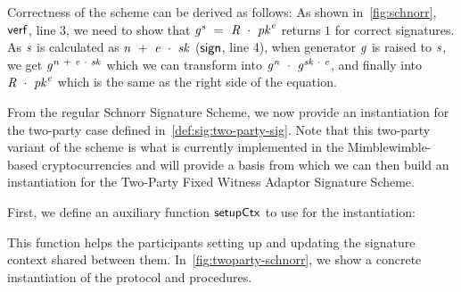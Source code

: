 Correctness of the scheme can be derived as follows:
As shown in~\cref{fig:schnorr}, $\mathsf{verf}$, line 3, we need to show that $\mathit{g}^{\mathit{s}} ~=~ \mathit{R} ~\cdot~ \mathit{pk}^{\mathit{e}}$ returns $1$ for correct signatures.
As $\mathit{s}$ is calculated as $\mathit{n} ~+~ \mathit{e} ~\cdot~ \mathit{sk}$ ($\mathsf{sign}$, line 4), when generator $\mathit{g}$ is raised to $\mathit{s}$, we get $\mathit{g}^{\mathit{n} ~+~ \mathit{e} ~\cdot~ \mathit{sk}}$ which we can transform into $\mathit{g}^{\mathit{n}} ~\cdot~ \mathit{g}^{\mathit{sk} ~\cdot~ \mathit{e}}$, and finally into $\mathit{R} ~\cdot~ \mathit{pk}^{\mathit{e}}$ which is the same as the right side of the equation.

From the regular Schnorr Signature Scheme, we now provide an instantiation for the two-party case defined in~\cref{def:sig:two-party-sig}.
Note that this two-party variant of the scheme is what is currently implemented in the Mimblewimble-based cryptocurrencies and will provide a basis from which we can then build an instantiation for the Two-Party Fixed Witness Adaptor Signature Scheme.

First, we define an auxiliary function $\mathsf{setupCtx}$ to use for the instantiation:

\begin{center}
    \fbox{
    \begin{varwidth}{\textwidth}
        \procedure[linenumbering]{$\procSetupCtx{\varSigContext}{\varPubKeyAlice}{\varRandAlice}$} {
        \opAccess{\varSigContext}{\varPubKey} \opAssign \opAccess{\varSigContext}{\varPubKey} \opAddPoint \varPubKeyAlice \\
        \opAccess{\varSigContext}{\varRand} \opAssign \opAccess{\varSigContext}{\varRand} \opAddPoint \varRandAlice \\
        \pcreturn \varSigContext
        } \\
    \end{varwidth}
    }
\end{center}

This function helps the participants setting up and updating the signature context shared between them.
In~\cref{fig:twoparty-schnorr}, we show a concrete instantiation of the protocol and procedures.

